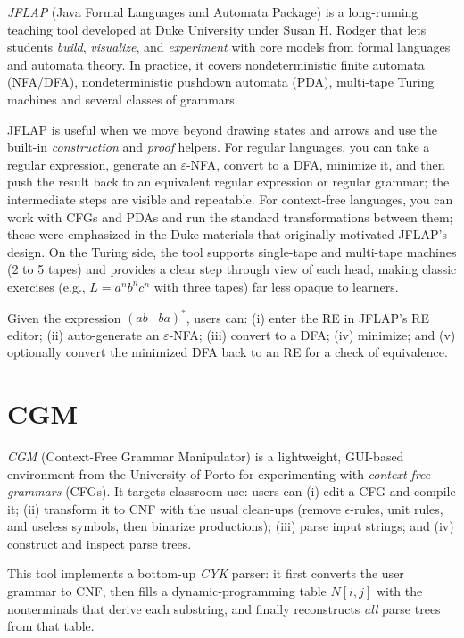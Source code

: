 \textit{JFLAP} (Java Formal Languages and Automata Package) is a long-running teaching tool developed at Duke University under 
Susan H. Rodger that lets students \emph{build}, \emph{visualize}, and \emph{experiment} with core models from formal languages 
and automata theory. 
In practice, it covers nondeterministic finite automata (NFA/DFA), nondeterministic pushdown automata (PDA), multi-tape Turing 
machines and several classes of grammars.

JFLAP is useful when we move beyond drawing states and arrows and use the built-in \emph{construction} and \emph{proof} helpers. 
For regular languages, you can take a regular expression, generate an $\varepsilon$-NFA, convert to a DFA, minimize it, and then 
push the result back to an equivalent regular expression or regular grammar; the intermediate steps are visible and repeatable. 
For context-free languages, you can work with CFGs and PDAs and run the standard transformations between them; 
these were emphasized in the Duke materials that originally motivated JFLAP's design. 
On the Turing side, the tool supports single-tape and multi-tape machines (2 to 5 tapes) and provides a clear step through view of 
each head, making classic exercises (e.g., $L={a^n b^n c^n}$ with three tapes) far less opaque to learners. 

Given the expression $(ab \mid ba)^*$, users can: 
(i) enter the RE in JFLAP's RE editor; 
(ii) auto-generate an $\varepsilon$-NFA; 
(iii) convert to a DFA; 
(iv) minimize; and 
(v) optionally convert the minimized DFA back to an RE for a check of equivalence. 

\section{CGM}

\textit{CGM} (Context-Free Grammar Manipulator) is a lightweight, GUI-based environment from the University of Porto for experimenting with 
\emph{context-free grammars} (CFGs).
 It targets classroom use: users can (i) edit a CFG and compile it; (ii) transform it to CNF with the usual clean-ups (remove $\epsilon$-rules, unit 
 rules, and useless symbols, then binarize productions); (iii) parse input strings; and (iv) construct and inspect parse trees.

This tool implements a bottom-up \emph{CYK} parser: it first converts the user grammar to CNF, then fills a dynamic-programming 
table $N[i,j]$ with the nonterminals that derive each substring, and finally reconstructs \emph{all} parse trees from that table.

